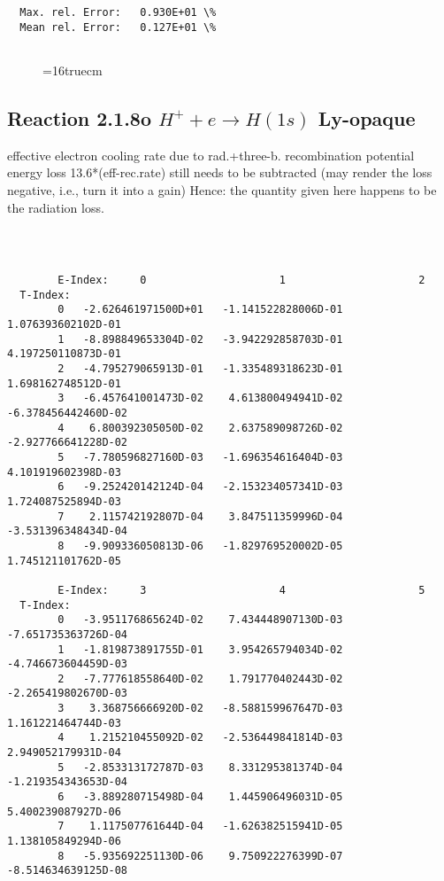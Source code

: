 \documentclass[12pt,dvipdfmx]{article}
\begin{document}
{\begin{small}
\begin{verbatim}
  Max. rel. Error:   0.930E+01 \%
  Mean rel. Error:   0.127E+01 \%


\end{verbatim}\end{small}
\begin{figure} \label{2.1.8r}
\epsfxsize=16truecm
\end{figure}
\newpage



\subsection{
  Reaction 2.1.8o $H^+ + e \rightarrow H(1s) $ Ly-opaque
}

   effective electron cooling rate due to rad.+three-b. recombination
   potential energy loss 13.6*(eff-rec.rate) still needs to be
   subtracted (may render the loss negative, i.e., turn it into a gain)
   Hence: the quantity given here happens to be the radiation loss.

\begin{small}\begin{verbatim}



        E-Index:     0                     1                     2
  T-Index:
        0   -2.626461971500D+01   -1.141522828006D-01    1.076393602102D-01
        1   -8.898849653304D-02   -3.942292858703D-01    4.197250110873D-01
        2   -4.795279065913D-01   -1.335489318623D-01    1.698162748512D-01
        3   -6.457641001473D-02    4.613800494941D-02   -6.378456442460D-02
        4    6.800392305050D-02    2.637589098726D-02   -2.927766641228D-02
        5   -7.780596827160D-03   -1.696354616404D-03    4.101919602398D-03
        6   -9.252420142124D-04   -2.153234057341D-03    1.724087525894D-03
        7    2.115742192807D-04    3.847511359996D-04   -3.531396348434D-04
        8   -9.909336050813D-06   -1.829769520002D-05    1.745121101762D-05

        E-Index:     3                     4                     5
  T-Index:
        0   -3.951176865624D-02    7.434448907130D-03   -7.651735363726D-04
        1   -1.819873891755D-01    3.954265794034D-02   -4.746673604459D-03
        2   -7.777618558640D-02    1.791770402443D-02   -2.265419802670D-03
        3    3.368756666920D-02   -8.588159967647D-03    1.161221464744D-03
        4    1.215210455092D-02   -2.536449841814D-03    2.949052179931D-04
        5   -2.853313172787D-03    8.331295381374D-04   -1.219354343653D-04
        6   -3.889280715498D-04    1.445906496031D-05    5.400239087927D-06
        7    1.117507761644D-04   -1.626382515941D-05    1.138105849294D-06
        8   -5.935692251130D-06    9.750922276399D-07   -8.514634639125D-08


\end{verbatim}
\end{small}}
\end{document}
